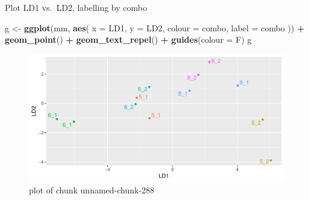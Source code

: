 \documentclass[ignorenonframetext,]{beamer}
\newenvironment{Shaded}{\begin{snugshade}}{\end{snugshade}}
\newcommand{\DataTypeTok}[1]{\textcolor[rgb]{0.13,0.29,0.53}{#1}}
\newcommand{\KeywordTok}[1]{\textcolor[rgb]{0.13,0.29,0.53}{\textbf{#1}}}
\newcommand{\NormalTok}[1]{#1}
\newcommand{\OperatorTok}[1]{\textcolor[rgb]{0.81,0.36,0.00}{\textbf{#1}}}
\newcommand{\StringTok}[1]{\textcolor[rgb]{0.31,0.60,0.02}{#1}}
\begin{document}
\begin{frame}[fragile]{Plot LD1 vs.~LD2, labelling by combo}
\protect\hypertarget{plot-ld1-vs.ld2-labelling-by-combo}{}

\begin{Shaded}
\begin{Highlighting}[]
\NormalTok{g <-}\StringTok{ }\KeywordTok{ggplot}\NormalTok{(mm, }\KeywordTok{aes}\NormalTok{(}
  \DataTypeTok{x =}\NormalTok{ LD1, }\DataTypeTok{y =}\NormalTok{ LD2, }\DataTypeTok{colour =}\NormalTok{ combo,}
  \DataTypeTok{label =}\NormalTok{ combo}
\NormalTok{)) }\OperatorTok{+}\StringTok{ }\KeywordTok{geom_point}\NormalTok{() }\OperatorTok{+}
\StringTok{  }\KeywordTok{geom_text_repel}\NormalTok{() }\OperatorTok{+}\StringTok{ }\KeywordTok{guides}\NormalTok{(}\DataTypeTok{colour =}\NormalTok{ F)}
\NormalTok{g}
\end{Highlighting}
\end{Shaded}

\begin{figure}
\centering
\includegraphics{figure/unnamed-chunk-288-1.pdf}
\caption{plot of chunk unnamed-chunk-288}
\end{figure}

\end{frame}
\end{document}
